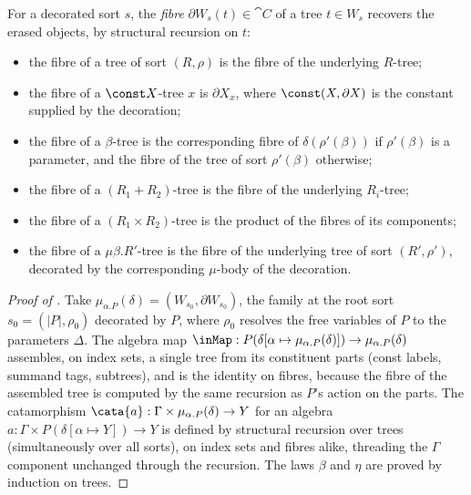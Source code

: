 \begin{definition}[Fibres]
\label{def:polynomial-types:fibres}
For a decorated sort $s$, the \emph{fibre} $\partial W_s(t) \in \cat{C}$ of a tree $t \in W_s$
recovers the erased objects, by structural recursion on $t$:
\begin{itemize}
\item the fibre of a tree of sort $(R, \rho)$ is the fibre of the underlying $R$-tree;
\item the fibre of a $\const X$-tree $x$ is $\partial X_x$, where $\const(X, \partial X)$ is the
  constant supplied by the decoration;
\item the fibre of a $\beta$-tree is the corresponding fibre of $\delta(\rho'(\beta))$ if
  $\rho'(\beta)$ is a parameter, and the fibre of the tree of sort $\rho'(\beta)$ otherwise;
\item the fibre of a $(R_1 + R_2)$-tree is the fibre of the underlying $R_i$-tree;
\item the fibre of a $(R_1 \times R_2)$-tree is the product of the fibres of its components;
\item the fibre of a $\mu\beta.R'$-tree is the fibre of the underlying tree of sort $(R', \rho')$,
  decorated by the corresponding $\mu$-body of the decoration.
\end{itemize}
\end{definition}

\begin{proof}[Proof of ]
Take $\mu_{\alpha.P}(\delta) = (W_{s_0}, \partial W_{s_0})$, the family at the root sort $s_0 = (|P|,
\rho_0)$ decorated by $P$, where $\rho_0$ resolves the free variables of $P$ to the parameters
$\Delta$. The algebra map
$\inMap : P(\delta[\alpha \mapsto \mu_{\alpha.P}(\delta)]) \to \mu_{\alpha.P}(\delta)$ assembles, on
index sets, a single tree from its constituent parts (const labels, summand tags, subtrees),
and is the identity on fibres, because the fibre of the assembled tree is computed by the same recursion
as $P$'s action on the parts. The catamorphism $\cata{a} : \Gamma \times \mu_{\alpha.P}(\delta) \to Y$
for an algebra $a : \Gamma \times P(\delta[\alpha \mapsto Y]) \to Y$ is defined by structural recursion
over trees (simultaneously over all sorts), on index sets and fibres alike, threading the $\Gamma$
component unchanged through the recursion. The laws $\beta$ and $\eta$ are proved by induction on trees.
\end{proof}

